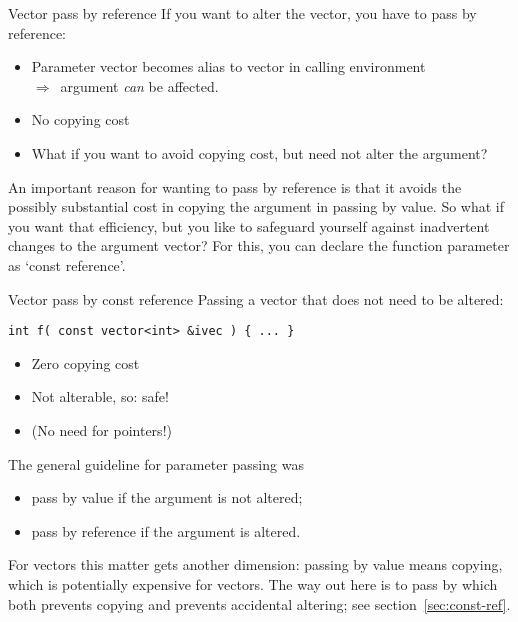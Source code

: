 

\begin{slide}{Vector pass by reference}
  \label{sl:vector-arg-ref}
  If you want to alter the vector, you have to pass by reference:
  \begin{itemize}
  \item Parameter vector becomes alias to vector in calling environment\\
    $\Rightarrow$~argument \emph{can} be affected.
  \item No copying cost
  \item What if you want to avoid copying cost, but need not alter the argument?
  \end{itemize}
\end{slide}

An important reason for wanting to pass by reference is that it avoids
the possibly substantial cost in copying the argument in passing by value.
So what if you want that efficiency, but you like to safeguard yourself
against inadvertent changes to the argument vector?
For this, you can declare the function parameter as `const reference'.

\begin{block}{Vector pass by const reference}
  \label{sl:vector-const-ref}
  Passing a vector that does not need to be altered:
\begin{lstlisting}
int f( const vector<int> &ivec ) { ... }    
\end{lstlisting}
\begin{itemize}
\item Zero copying cost
\item Not alterable, so: safe!
\item (No need for pointers!)
\end{itemize}
\end{block}

The general guideline for parameter passing was
\begin{itemize}
\item pass by value if the argument is not altered;
\item pass by reference if the argument is altered.
\end{itemize}
For vectors this matter gets another dimension:
passing by value means copying, which is potentially expensive for vectors.
The way out here is to pass by 
which both prevents copying and prevents accidental altering;
see section~\ref{sec:const-ref}.

